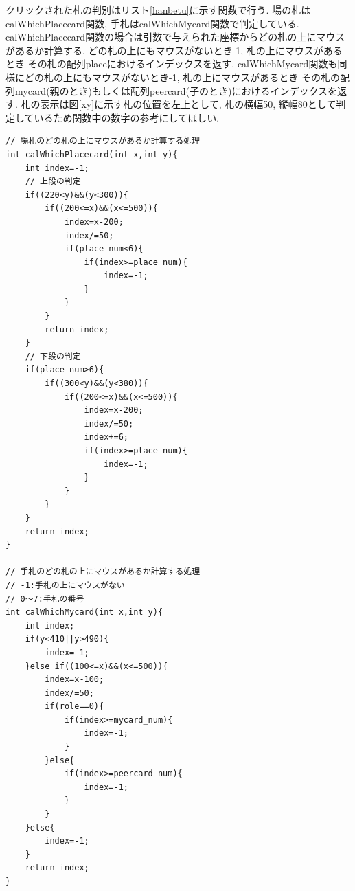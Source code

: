 \documentclass[a4j]{jarticle}
\begin{document}
    クリックされた札の判別はリスト\ref{hanbetu}に示す関数で行う. 場の札はcalWhichPlacecard関数, 手札はcalWhichMycard関数で判定している.
    calWhichPlacecard関数の場合は引数で与えられた座標からどの札の上にマウスがあるか計算する. どの札の上にもマウスがないとき-1, 札の上にマウスがあるとき
    その札の配列placeにおけるインデックスを返す. calWhichMycard関数も同様にどの札の上にもマウスがないとき-1, 札の上にマウスがあるとき
    その札の配列mycard(親のとき)もしくは配列peercard(子のとき)におけるインデックスを返す. 札の表示は図\ref{xy}に示す札の位置を左上として, 
    札の横幅50, 縦幅80として判定しているため関数中の数字の参考にしてほしい.
\begin{lstlisting}[basicstyle=\ttfamily\footnotesize, frame=single,label=hanbetu,caption=クリックされた札の判別]
// 場札のどの札の上にマウスがあるか計算する処理
int calWhichPlacecard(int x,int y){
    int index=-1;
    // 上段の判定
    if((220<y)&&(y<300)){
        if((200<=x)&&(x<=500)){
            index=x-200;
            index/=50;
            if(place_num<6){
                if(index>=place_num){
                    index=-1;
                }
            }
        }
        return index;
    }
    // 下段の判定
    if(place_num>6){
        if((300<y)&&(y<380)){
            if((200<=x)&&(x<=500)){
                index=x-200;
                index/=50;
                index+=6;
                if(index>=place_num){
                    index=-1;
                }        
            }
        }
    }
    return index;
}

// 手札のどの札の上にマウスがあるか計算する処理
// -1:手札の上にマウスがない
// 0～7:手札の番号
int calWhichMycard(int x,int y){
    int index;
    if(y<410||y>490){
        index=-1;
    }else if((100<=x)&&(x<=500)){
        index=x-100;
        index/=50;
        if(role==0){
            if(index>=mycard_num){
                index=-1;
            }
        }else{
            if(index>=peercard_num){
                index=-1;
            }            
        }
    }else{
        index=-1;
    }
    return index;
}
\end{lstlisting}
\end{document}
